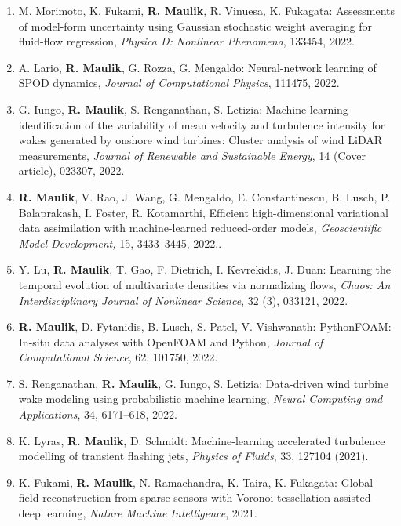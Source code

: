 \documentclass[letterpaper]{article}
\begin{document}
\begin{enumerate}

\item M. Morimoto, K. Fukami, \textbf{R. Maulik}, R. Vinuesa, K. Fukagata: Assessments of model-form uncertainty using Gaussian stochastic weight averaging for fluid-flow regression, {\it Physica D: Nonlinear Phenomena}, 133454, 2022.

\item A. Lario, \textbf{R. Maulik}, G. Rozza, G. Mengaldo: Neural-network learning of SPOD dynamics, {\it Journal of Computational Physics}, 111475, 2022.

\item G. Iungo, \textbf{R. Maulik}, S. Renganathan, S. Letizia: Machine-learning identification of the variability of mean velocity and turbulence intensity for wakes generated by onshore wind turbines: Cluster analysis of wind LiDAR measurements, {\it Journal of Renewable and Sustainable Energy}, 14 (Cover article), 023307, 2022.

\item \textbf{R. Maulik}, V. Rao, J. Wang, G. Mengaldo, E. Constantinescu, B. Lusch, P. Balaprakash, I. Foster, R. Kotamarthi, Efficient high-dimensional variational data assimilation with machine-learned reduced-order models, {\it Geoscientific Model Development,} 15, 3433–3445, 2022..

\item Y. Lu, \textbf{R. Maulik}, T. Gao, F. Dietrich, I. Kevrekidis, J. Duan: Learning the temporal evolution of multivariate densities via normalizing flows, {\it Chaos: An Interdisciplinary Journal of Nonlinear Science}, 32 (3), 033121, 2022.

\item \textbf{R. Maulik}, D. Fytanidis, B. Lusch, S. Patel, V. Vishwanath: PythonFOAM: In-situ data analyses with OpenFOAM and Python, {\it Journal of Computational Science}, 62, 101750, 2022.

\item S. Renganathan, \textbf{R. Maulik}, G. Iungo, S. Letizia: Data-driven wind turbine wake modeling using probabilistic machine learning, {\it Neural Computing and Applications}, 34, 6171–618, 2022.

\item K. Lyras, \textbf{R. Maulik}, D. Schmidt: Machine-learning accelerated turbulence modelling of transient flashing jets, {\it Physics of Fluids}, 33, 127104 (2021).

\item K. Fukami, \textbf{R. Maulik}, N. Ramachandra, K. Taira, K. Fukagata: Global field reconstruction from sparse sensors with Voronoi tessellation-assisted deep learning, {\it Nature Machine Intelligence}, 2021.


\end{enumerate}
\end{document}
